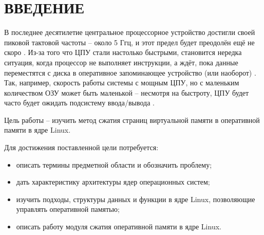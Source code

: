 \section*{ВВЕДЕНИЕ}

В последнее десятилетие центральное процессорное устройство  достигли своей пиковой тактовой частоты -- около 5 Ггц, и этот предел будет преодолён ещё не скоро \cite{cpu_pick}. Из-за того что ЦПУ стали настолько быстрыми, становится нередка ситуация, когда процессор не выполняет инструкции, а ждёт, пока данные переместятся с диска в оперативное запоминающее устройство (или наоборот) \cite{in-kernel-memory-compression}. Так, например, скорость работы системы с мощным ЦПУ, но с маленьким количеством ОЗУ может быть маленькой -- несмотря на быстроту, ЦПУ будет часто будет ожидать подсистему ввода/вывода \cite{in-kernel-memory-compression}.

Цель работы -- изучить метод сжатия страниц виртуальной памяти в оперативной памяти в ядре Linux.

Для достижения поставленной цели потребуется:

\begin{itemize}
	\item описать термины предметной области и обозначить проблему;
	\item дать характеристику архитектуры ядер операционных систем;
	\item изучить подходы, структуры данных и функции в ядре Linux, позволяющие управлять оперативной памятью;
	\item описать работу модуля сжатия оперативной памяти в ядре Linux.
\end{itemize}

\pagebreak
